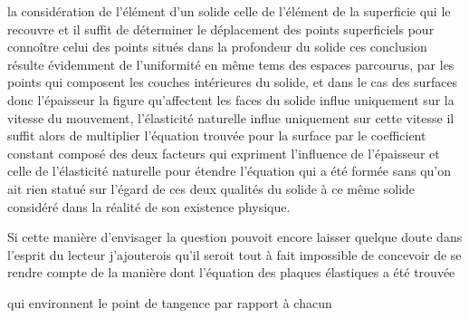 \documentclass[11pt,a4paper]{article}
\begin{document}
la considération de l'élément d'un solide celle de l'élément de la
 superficie qui le recouvre et il suffit de
déterminer le déplacement des points superficiels pour connoître celui
des points situés dans la profondeur du solide  ces
conclusion résulte évidemment de l'uniformité en même tems des espaces
parcourus, par les points qui composent les couches intérieures du
solide, et
dans le cas des surfaces donc l'épaisseur  la figure qu'affectent les faces du solide 
influe uniquement sur la vitesse du mouvement,  l'élasticité naturelle influe  uniquement
sur cette  vitesse  il suffit
alors de multiplier l'équation trouvée pour la surface par le
coefficient constant  composé des deux facteurs qui
expriment l'influence de l'épaisseur et celle de l'élasticité
naturelle pour étendre l'équation qui a été formée sans qu'on ait rien
statué sur  l'égard de ces deux qualités du solide à ce même
solide considéré dans la réalité de son existence physique.
\struck{\ill{}}

Si cette manière d'envisager la question pouvoit encore laisser
quelque doute dans l'esprit du lecteur j'ajouterois \struck{\ill{}}
qu'il seroit  tout à fait impossible de concevoir de se
rendre compte de la manière dont l'équation des plaques élastiques a
été trouvée

qui environnent le point de tangence  par rapport à
chacun 
\end{document}
